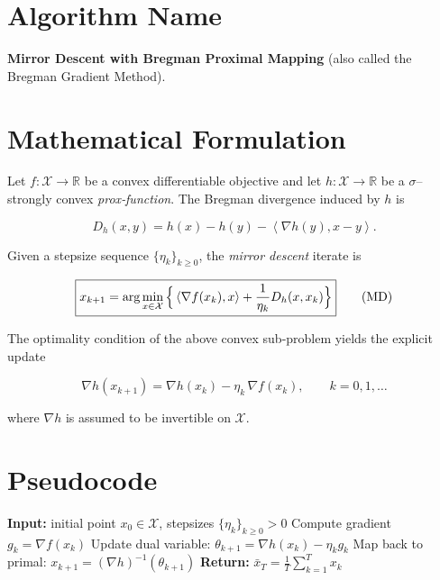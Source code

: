 \documentclass{article}
\newcommand{\ip}[2]{\left\langle #1,#2\right\rangle}
\newcommand{\D}[2]{D_h(#1,#2)}
\newcommand{\grad}[1]{\nabla #1}
\begin{document}
\section*{Algorithm Name}
\textbf{Mirror Descent with Bregman Proximal Mapping} (also called the Bregman Gradient Method).

\section*{Mathematical Formulation}
Let $f:\mathcal{X}\rightarrow\mathbb{R}$ be a convex differentiable objective and let $h:\mathcal{X}\rightarrow\mathbb{R}$ be a $\sigma$–strongly convex \emph{prox‑function}.  
The Bregman divergence induced by $h$ is  

\[
\D{x}{y}=h(x)-h(y)-\ip{\grad{h}(y)}{x-y}.
\]

Given a stepsize sequence $\{\eta_k\}_{k\ge 0}$, the \emph{mirror descent} iterate is  

\[
\boxed{%
x_{k+1}= \arg\min_{x\in\mathcal{X}}\Big\{ \ip{\grad{f}(x_k)}{x}+\frac{1}{\eta_k}\D{x}{x_k}\Big\}
}\tag{MD}
\]

The optimality condition of the above convex sub‑problem yields the explicit update  

\[
\grad{h}(x_{k+1}) = \grad{h}(x_k)-\eta_k\,\grad{f}(x_k),\qquad k=0,1,\dots
\] 

where $\grad{h}$ is assumed to be invertible on $\mathcal{X}$.

\section*{Pseudocode}
\begin{algorithm}[H]
\caption{Mirror Descent}
\begin{algorithmic}[1]
\State \textbf{Input:} initial point $x_0\in\mathcal{X}$, stepsizes $\{\eta_k\}_{k\ge0}>0$ 
    \State Compute gradient $g_k=\grad{f}(x_k)$
    \State Update dual variable: $\theta_{k+1}= \grad{h}(x_k)-\eta_k g_k$
    \State Map back to primal: $x_{k+1}= (\grad{h})^{-1}(\theta_{k+1})$
\EndFor
\State \textbf{Return:} $\displaystyle \bar{x}_T=\frac1T\sum_{k=1}^{T}x_k$
\end{algorithmic}
\end{algorithm}

\end{document}
